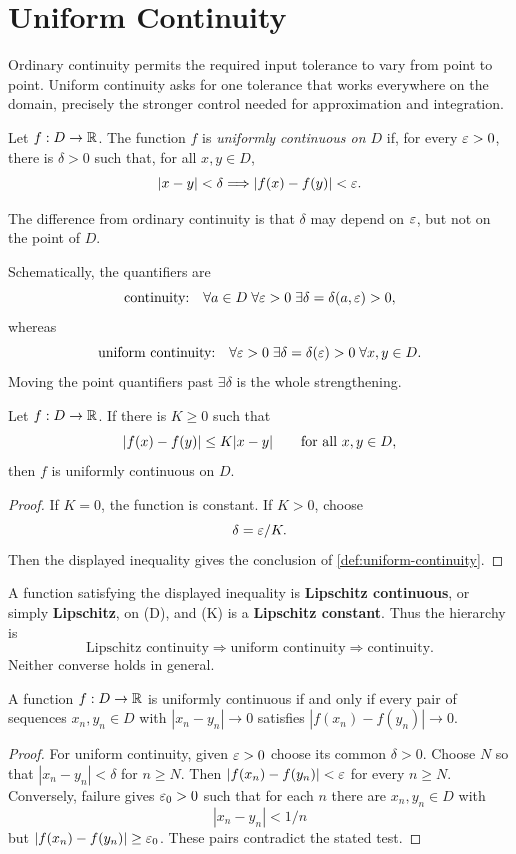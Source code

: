 \section{Uniform Continuity}

Ordinary continuity permits the required input tolerance to vary from point
to point.  Uniform continuity asks for one tolerance that works everywhere
on the domain, precisely the stronger control needed for approximation and
integration.

\begin{definition}
\label{def:uniform-continuity}
Let $f:D\to\mathbb{R}$. The function $f$ is \emph{uniformly continuous on $D$} if, for every $\varepsilon>0$, there is $\delta>0$ such that, for all $x,y\in D$,
\[
\lvert x-y\rvert<\delta\Longrightarrow\lvert f(x)-f(y)\rvert<\varepsilon.
\]
\end{definition}

The difference from ordinary continuity is that $\delta$ may depend on $\varepsilon$, but not on the point of $D$.

Schematically, the quantifiers are
\[
\text{continuity:}\quad
\forall a\in D\;\forall\varepsilon>0\;\exists\delta=\delta(a,\varepsilon)>0,
\]
whereas
\[
\text{uniform continuity:}\quad
\forall\varepsilon>0\;\exists\delta=\delta(\varepsilon)>0\;\forall x,y\in D.
\]
Moving the point quantifiers past $\exists\delta$ is the whole strengthening.

\begin{proposition}
\label{prop:lipschitz-uniform}
Let $f:D\to\mathbb{R}$. If there is $K\geq0$ such that
\[
\lvert f(x)-f(y)\rvert\leq K\lvert x-y\rvert
\qquad\text{for all }x,y\in D,
\]
then $f$ is uniformly continuous on $D$.
\end{proposition}
\begin{proof}
If $K=0$, the function is constant. If $K>0$, choose
\[
\delta=\varepsilon/K.
\]
 Then the displayed inequality gives the conclusion of \cref{def:uniform-continuity}.
\end{proof}

 A function satisfying the displayed inequality is \textbf{Lipschitz
continuous}, or simply \textbf{Lipschitz}, on (D), and (K) is a
\textbf{Lipschitz constant}. Thus the hierarchy is
\[
\text{Lipschitz continuity}\Longrightarrow\text{uniform continuity}
\Longrightarrow\text{continuity}.
\]
Neither converse holds in general.

\begin{proposition}
\label{prop:uniform-continuity-pairs}
A function $f:D\to\mathbb{R}$ is uniformly continuous if and only if every
pair of sequences $x_n,y_n\in D$ with $|x_n-y_n|\to0$ satisfies
$|f(x_n)-f(y_n)|\to0$.
\end{proposition}
\begin{proof}
For uniform continuity, given $\varepsilon>0$ choose its common $\delta>0$.
Choose $N$ so that $|x_n-y_n|<\delta$ for $n\geq N$.
Then $|f(x_n)-f(y_n)|<\varepsilon$ for every $n\geq N$.
Conversely, failure gives $\varepsilon_0>0$ such that for each $n$ there are
$x_n,y_n\in D$ with
\[
|x_n-y_n|<1/n
\]
 but
$|f(x_n)-f(y_n)|\geq\varepsilon_0$. These pairs contradict the stated test.
\end{proof}

